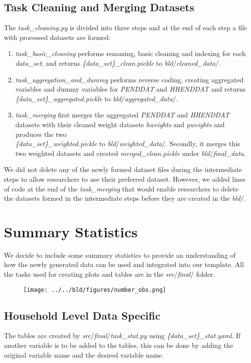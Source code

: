\documentclass[11pt, a4paper, leqno]{article}
\begin{document}
\subsection{Task Cleaning and Merging Datasets}
The \emph {task\_cleaning.py} is divided into three steps and at the end of each step a file with processed datasets are formed:
\begin{enumerate}
\item  \emph {task\_basic\_cleaning} performs renaming, basic cleaning and indexing for each \emph {data\_set}; and returns \emph {\{data\_set\}\_clean.pickle} to \emph {bld$/$cleaned\_data$/$}.
\item \emph {task\_aggregation\_and\_dummy} performs reverse coding, creating aggregated variables and dummy variables for \emph {PENDDAT} and \emph {HHENDDAT} and returns\\
\emph {\{data\_set\}\_aggregated.pickle} to \emph {bld$/$aggregated\_data$/$}.
\item \emph {task\_merging} first merges the aggregated \emph {PENDDAT} and \emph {HHENDDAT} datasets with their cleaned weight datasets \emph {hweights} and \emph {pweights} and produces the two\\ \emph {\{data\_set\}\_weighted.pickle} to \emph {bld$/$weighted\_data$/$}. Secondly, it merges this two weighted datasets and created \emph {merged\_clean.pickle} under \emph {bld$/$final\_data}.
\end{enumerate}
We did not delete any of the newly formed dataset files during the intermediate steps to allow researchers to use their preferred dataset. However, we added lines of code at the end of the \emph {task\_merging} that would enable researchers to delete the datasets formed in the intermediate steps before they are created in the \emph {bld$/$}.
\clearpage
\section{Summary Statistics}\label{section:stats}
We decide to include some summary statistics to provide an understanding of how the newly generated data can be used and integrated into our template. All the tasks used for creating plots and tables are in the \emph{src$/$final$/$} folder.\\[12pt]
\begin{figure}[htbp]
    \centerline{\texttt{[image: ../../bld/figures/number\_obs.png]}}
    \end{figure}
\clearpage
\subsection{Household Level Data Specific}
The tables are created by \emph{src$/$final$/$task\_stat.py} using \emph {\{data\_set\}\_stat.yaml}. If another variable is to be added to the tables, this can be done by adding the original variable name and the desired variable name.
\begin{footnotesize}
\begin{center}

\end{center}
\end{footnotesize}
\end{document}
